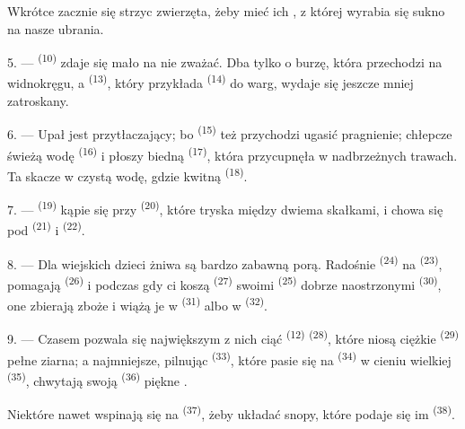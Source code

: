 Wkrótce zacznie się strzyc  zwierzęta, żeby mieć ich , z której
wyrabia się sukno na nasze ubrania.

\VUsaut{5.0mm}
\VUsaut{3.4mm}

5. ---  \textsuperscript{(10)} zdaje się mało na nie zważać. Dba tylko o
burzę, która przechodzi na widnokręgu, a  \textsuperscript{(13)}, który
przykłada  \textsuperscript{(14)} do warg, wydaje się jeszcze
mniej zatroskany.

6. --- Upał jest przytłaczający; bo  \textsuperscript{(15)} też przychodzi
ugasić pragnienie; chłepcze świeżą wodę  \textsuperscript{(16)} i płoszy
biedną  \textsuperscript{(17)}, która przycupnęła w nadbrzeżnych trawach.
Ta skacze w czystą wodę, gdzie kwitną  \textsuperscript{(18)}.

7. ---  \textsuperscript{(19)} kąpie się przy 
\textsuperscript{(20)}, które tryska między dwiema skałkami, i chowa się pod
 \textsuperscript{(21)} i 
\textsuperscript{(22)}.

\VUsaut{5.0mm}
\VUsaut{3.4mm}

8. --- Dla wiejskich dzieci żniwa są bardzo zabawną porą. Radośnie
\textsuperscript{(24)} na 
\textsuperscript{(23)}, pomagają  \textsuperscript{(26)} i podczas gdy
ci koszą  \textsuperscript{(27)} swoimi 
\textsuperscript{(25)} dobrze naostrzonymi  \textsuperscript{(30)}, one
zbierają zboże i wiążą je w  \textsuperscript{(31)} albo w
 \textsuperscript{(32)}.

9. --- Czasem pozwala się największym z nich ciąć 
\textsuperscript{(12)}  \textsuperscript{(28)}, które niosą ciężkie
 \textsuperscript{(29)} pełne ziarna; a najmniejsze, pilnując
 \textsuperscript{(33)}, które pasie się na 
\textsuperscript{(34)} w cieniu wielkiej  \textsuperscript{(35)}, chwytają
swoją  \textsuperscript{(36)} piękne .

Niektóre nawet wspinają się na  \textsuperscript{(37)}, żeby układać snopy,
które podaje się im  \textsuperscript{(38)}.

